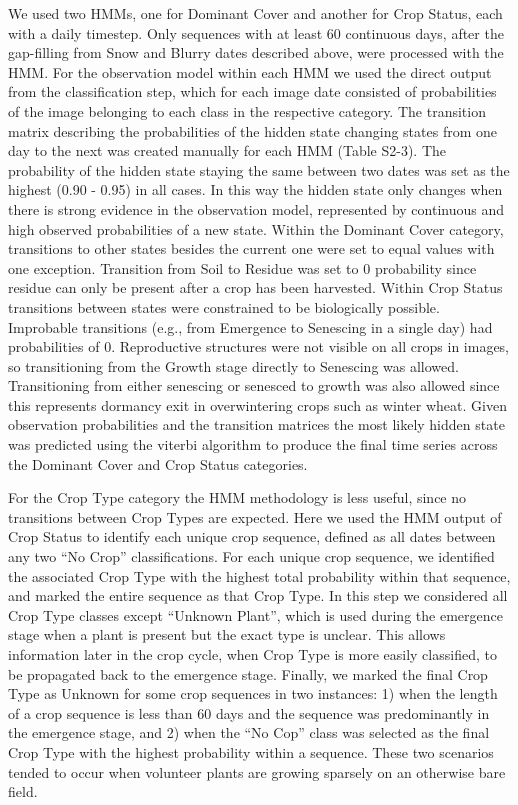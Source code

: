 \documentclass{article}
\begin{document}
We used two HMMs, one for Dominant Cover and another for Crop Status, each with a daily timestep. Only sequences with at least 60 continuous days, after the gap-filling from Snow and Blurry dates described above, were processed with the HMM. For the observation model within each HMM we used the direct output from the classification step, which for each image date consisted of probabilities of the image belonging to each class in the respective category. The transition matrix describing the probabilities of the hidden state changing states from one day to the next was created manually for each HMM (Table S2-3). The probability of the hidden state staying the same between two dates was set as the highest (0.90 - 0.95) in all cases. In this way the hidden state only changes when there is strong evidence in the observation model, represented by continuous and high observed probabilities of a new state. Within the Dominant Cover category, transitions to other states besides the current one were set to equal values with one exception. Transition from Soil to Residue was set to 0 probability since residue can only be present after a crop has been harvested. Within Crop Status transitions between states were constrained to be biologically possible. Improbable transitions (e.g., from Emergence to Senescing in a single day) had probabilities of 0. Reproductive structures were not visible on all crops in images, so transitioning from the Growth stage directly to Senescing was allowed. Transitioning from either senescing or senesced to growth was also allowed since this represents dormancy exit in overwintering crops such as winter wheat. Given observation probabilities and the transition matrices the most likely hidden state was predicted using the viterbi algorithm to produce the final time series across the Dominant Cover and Crop Status categories. 

For the Crop Type category the HMM methodology is less useful, since no transitions between Crop Types are expected. Here we used the HMM output of Crop Status to identify each unique crop sequence, defined as all dates between any two “No Crop” classifications. For each unique crop sequence, we identified the associated Crop Type with the highest total probability within that sequence, and marked the entire sequence as that Crop Type. In this step we considered all Crop Type classes except “Unknown Plant”, which is used during the emergence stage when a plant is present but the exact type is unclear. This allows information later in the crop cycle, when Crop Type is more easily classified, to be propagated back to the emergence stage. Finally, we marked the final Crop Type as Unknown for some crop sequences in two instances: 1) when the length of a crop sequence is less than 60 days and the sequence was predominantly in the emergence stage, and 2) when the “No Cop” class was selected as the final Crop Type with the highest probability within a sequence. These two scenarios tended to occur when volunteer plants are growing sparsely on an otherwise bare field. 
\end{document}
